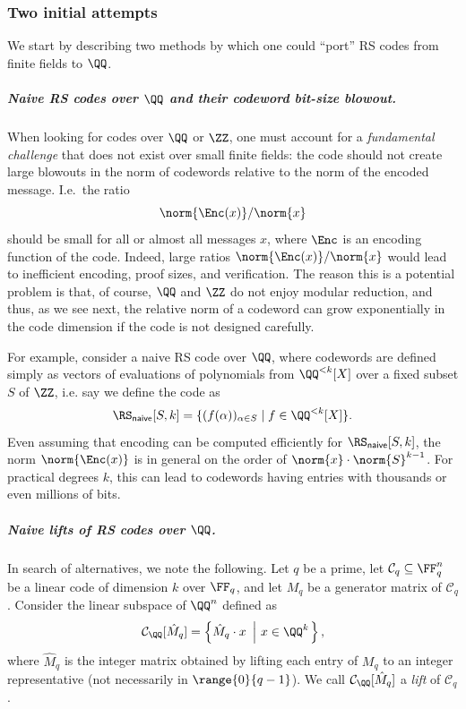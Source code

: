 \subsubsection{Two initial attempts}

We start by describing two methods by which one could ``port'' RS codes from finite fields to $\QQ$.

\subparagraph{Naive RS codes over $\QQ$ and their codeword bit-size blowout.} When looking for codes over $\QQ$ or $\ZZ$, one must account for a \emph{fundamental challenge} that does not exist over small finite fields: the code should not create large blowouts in the norm of codewords relative to the norm of the encoded message. I.e.\ the ratio
%
$$
\norm{\Enc(x)}/\norm{x}
$$
%
should be small for all or almost all messages $x$, where $\Enc$ is an encoding function of the code. Indeed, large ratios $\norm{\Enc(x)}/\norm{x}$ would lead to inefficient encoding, proof sizes, and verification. The reason this is a potential problem is that, of course,  $\QQ$ and $\ZZ$ do not enjoy modular reduction, and thus, as we see next, the relative norm of a codeword can grow exponentially in the code dimension if the code is not designed carefully.

For example, consider a naive RS code over $\QQ$,  where codewords are defined simply as vectors of evaluations of polynomials from $\QQ^{<k}[X]$  over a fixed subset $S$ of $\ZZ$, i.e. say we define the code as
%
\begin{equation}\label{eq:naive_rs}
\RS_{\mathsf{naive}}[S, k] = \{ (f(\alpha))_{\alpha \in S} \mid f \in \QQ^{<k}[X] \}.
\end{equation}
Even assuming that encoding can be computed efficiently for $\RS_{\mathsf{naive}}[S, k]$, the norm $\norm{\Enc(x)}$ is in general  on the order of $\norm{x}\cdot\norm{S}^{k-1}$. For practical degrees $k$, this can lead to codewords having entries with thousands or even millions of bits.


\subparagraph{Naive lifts of RS codes over $\QQ$.} In search of alternatives, we note the following. Let $q$ be a prime, let $\mathcal{C}_q\subseteq\FF_q^n$ be a linear code of dimension $k$ over $\FF_q$, and let $M_q$ be a generator matrix of $\mathcal{C}_q$. Consider the linear subspace of $\QQ^n$ defined as
%
\begin{equation}\label{eq:lift_code}
\mathcal{C}_\QQ[\hat{M}_q] = \left\{ \hat{M}_q \cdot x \ \left| \ x \in \QQ^k \right.\right\},
\end{equation}
where $\hat{M}_q$ is the integer matrix obtained by lifting each entry of $M_q$ to an integer representative (not necessarily in $\range{0}{q-1}$). We call $\mathcal{C}_\QQ[\hat{M}_q]$ a \emph{lift} of $\mathcal{C}_q$.

